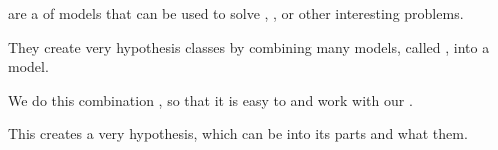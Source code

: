         \begin{definition}
             are a  of models that can be used to solve , , or other interesting problems.
            
            They create very  hypothesis classes by combining many  models, called , into a  model.
            
            We do this combination , so that it is easy to  and work with our .
            
            This creates a very  hypothesis, which can be  into its  parts and what  them.
        \end{definition}